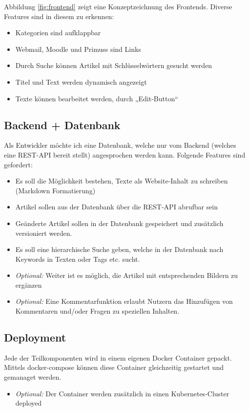 \documentclass[letterpaper, 10 pt, conference]{ieeeconf}  %
\begin{document}
Abbildung \ref{fig:frontend} zeigt eine Konzeptzeichnung des Frontends. Diverse Features sind in diesem zu erkennen:
\begin{itemize}
\item Kategorien sind aufklappbar
\item Webmail, Moodle und Primuss sind Links
\item Durch Suche können Artikel mit Schlüsselwörtern gesucht werden
\item Titel und Text werden dynamisch angezeigt
\item Texte können bearbeitet werden, durch „Edit-Button“
\end{itemize}

\subsection{Backend + Datenbank}

Als Entwickler möchte ich eine Datenbank, welche nur vom Backend (welches eine REST-API bereit stellt) angesprochen werden kann. Folgende Features sind gefordert:

\begin{itemize}
\item Es soll die Möglichkeit bestehen, Texte als Website-Inhalt zu schreiben (Markdown Formatierung)
\item Artikel sollen aus der Datenbank über die REST-API abrufbar sein
\item Geänderte Artikel sollen in der Datenbank gespeichert und zusätzlich versioniert werden.
\item Es soll eine hierarchische Suche geben, welche in der Datenbank nach Keywords in Texten oder Tags etc. sucht.
\item \textit{Optional:} Weiter ist es möglich, die Artikel mit entsprechenden Bildern zu ergänzen
\item \textit{Optional:} Eine Kommentarfunktion erlaubt Nutzern das Hinzufügen von Kommentaren und/oder Fragen zu speziellen Inhalten.

\end{itemize}

\subsection{Deployment}
Jede der Teilkomponenten wird in einem eigenen Docker Container gepackt. Mittels docker-compose können diese Container gleichzeitig gestartet und gemanaget werden.
\begin{itemize}
\item \textit{Optional:} Der Container werden zusätzlich in einen Kubernetes-Cluster deployed
\end{itemize}
\end{document}
